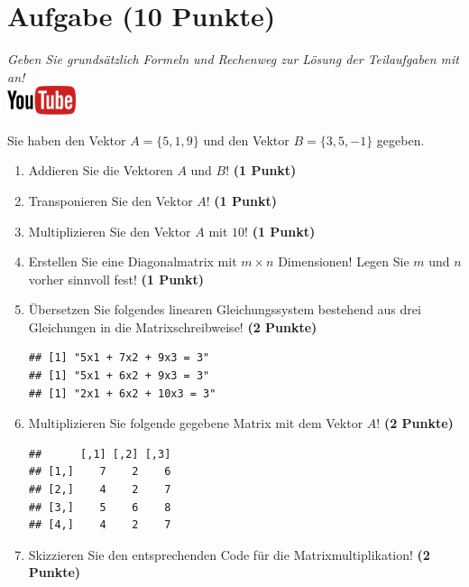 \documentclass[a4paper, 9pt]{scrartcl}\usepackage[]{graphicx}\usepackage[]{xcolor}
\makeatletter
\newenvironment{kframe}{%
 \def\at@end@of@kframe{}%
 \ifinner\ifhmode%
  \def\at@end@of@kframe{\end{minipage}}%
  \begin{minipage}{\columnwidth}%
 \fi\fi%
 \def\FrameCommand##1{\hskip\@totalleftmargin \hskip-\fboxsep
 \colorbox{shadecolor}{##1}\hskip-\fboxsep
     \hskip-\linewidth \hskip-\@totalleftmargin \hskip\columnwidth}%
 \MakeFramed {\advance\hsize-\width
   \@totalleftmargin\z@ \linewidth\hsize
   \@setminipage}}%
 {\par\unskip\endMakeFramed%
 \at@end@of@kframe}
\newenvironment{knitrout}{}{} %
\makeatother
\begin{document}
  
\clearpage

\section{Aufgabe \hfill (10 Punkte)}

\textit{Geben Sie grunds{\"a}tzlich Formeln und Rechenweg zur L{\"o}sung der
  Teilaufgaben mit an!} \\[1Ex]

\hfill\href{https://youtu.be/x_MwWJoEsME}{\includegraphics[width =
  2cm]{img/youtube}} %
\hspace{2Ex}



Sie haben den Vektor $A = \{5, 1, 9\}$ und den Vektor $B = \{3, 5, -1\}$ gegeben.

\begin{enumerate}
\item Addieren Sie die Vektoren $A$ und $B$! \textbf{(1 Punkt)}
\item Transponieren Sie den Vektor $A$!
  \textbf{(1 Punkt)} 
\item Multiplizieren Sie den Vektor $A$ mit
  $10$! \textbf{(1 Punkt)}
\item Erstellen Sie eine Diagonalmatrix mit $m \times n$ Dimensionen!
  Legen Sie $m$ und $n$ vorher sinnvoll fest! \textbf{(1 Punkt)}
\item {\"U}bersetzen Sie folgendes linearen Gleichungssystem bestehend aus drei
  Gleichungen in die Matrixschreibweise! \textbf{(2 Punkte)}
\begin{knitrout}
\color{fgcolor}\begin{kframe}
\begin{verbatim}
## [1] "5x1 + 7x2 + 9x3 = 3"
## [1] "5x1 + 6x2 + 9x3 = 3"
## [1] "2x1 + 6x2 + 10x3 = 3"
\end{verbatim}
\end{kframe}
\end{knitrout}
\item Multiplizieren Sie folgende gegebene Matrix mit dem Vektor $A$!
  \textbf{(2 Punkte)}
\begin{knitrout}
\color{fgcolor}\begin{kframe}
\begin{verbatim}
##      [,1] [,2] [,3]
## [1,]    7    2    6
## [2,]    4    2    7
## [3,]    5    6    8
## [4,]    4    2    7
\end{verbatim}
\end{kframe}
\end{knitrout}
\item Skizzieren Sie den entsprechenden \Rlogo Code f{\"u}r die
  Matrixmultiplikation! \textbf{(2 Punkte)}
\end{enumerate}
 
\end{document}
